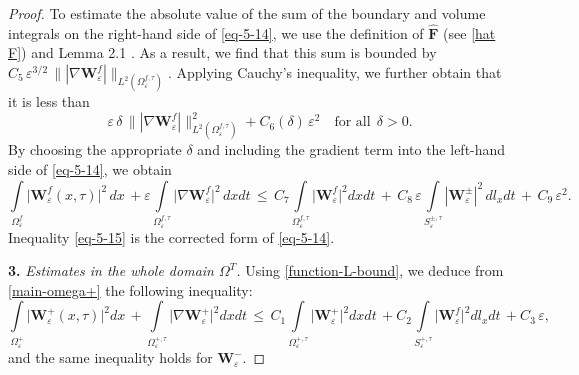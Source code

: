 \documentclass[reqno]{amsart}            %
\numberwithin{equation}{section}
\begin{document}
\begin{proof}
		To estimate the absolute value of the sum of the boundary and volume integrals on the right-hand side of \eqref{eq-5-14}, we use the definition of $\widehat{\mathbf{F}}$ (see \eqref{hat F}) and Lemma 2.1 \cite{Melnyk-Popov-2009}. As a result, we find that this sum is bounded by 
		$C_5 \, \varepsilon^{3/2} \, \||\nabla\mathbf{W}^f_\varepsilon|\|_{L^2(\Omega_\varepsilon^{f, \tau})}.$ Applying Cauchy's inequality, we further obtain that it is less than
		$$
		\varepsilon \, \delta \, \||\nabla\mathbf{W}^f_\varepsilon|\|^2_{L^2(\Omega_\varepsilon^{f, \tau})} + C_6(\delta) \, \varepsilon^2 \quad \text{for all} \ \ \delta >0.
		$$
		By choosing the appropriate \(\delta\) and including the gradient term into the left-hand side of \eqref{eq-5-14}, we obtain
		\begin{equation}\label{eq-5-15}  
			\int\limits_{\Omega_\varepsilon^f} \big|\mathbf{W}^f_\varepsilon(x,\tau)\big|^2 \, dx\,  + \varepsilon \int\limits_{\Omega_\varepsilon^{f, \tau}} \big|\nabla \mathbf{W}^f_\varepsilon\big|^2 \, dxdt \, \le \, C_7\int\limits_{\Omega_\varepsilon^{f, \tau}} \big|\mathbf{W}^f_\varepsilon\big|^2  dxdt \, + \,  C_8 \, \varepsilon  \int\limits_{S_\varepsilon^{\pm, \tau}} |\mathbf{W}^\pm_\varepsilon|^2 \, dl_xdt \,+\, C_9 \, \varepsilon^2 .
		\end{equation}
		Inequality \eqref{eq-5-15} is the corrected form of \eqref{eq-5-14}.
		
		\smallskip
		
			
		\noindent
		\textbf{3.}
		\emph{Estimates in the whole domain $\Omega^{T}$.} 
		Using \eqref{function-L-bound}, we deduce from \eqref{main-omega+}  the following inequality: 
		\begin{equation}\label{omega+}
			\int\limits_{\Omega_\varepsilon^+} \big|\mathbf{W}^+_\varepsilon(x,\tau)\big|^2  dx\,  + \int\limits_{\Omega_\varepsilon^{+, \tau}} \big|\nabla \mathbf{W}^+_\varepsilon\big|^2  dxdt \, \le \, C_1\int\limits_{\Omega_\varepsilon^{+, \tau}} \big|\mathbf{W}^+_\varepsilon\big|^2  dxdt \,
			+ C_2 \int\limits_{S_\varepsilon^{+, \tau}} \big|\mathbf{W}^f_\varepsilon\big|^2  dl_xdt \, + C_3 \, \varepsilon,
		\end{equation}
		and the same inequality holds for $\mathbf{W}^-_\varepsilon.$
		

\end{proof}
\end{document}
